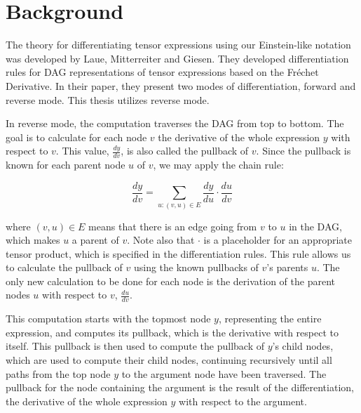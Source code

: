 \documentclass[12pt, a4paper]{report}
\begin{document}
\section{Background}
The theory for differentiating tensor expressions using our Einstein-like notation was developed by Laue, Mitterreiter and Giesen.
They developed differentiation rules for DAG representations of tensor expressions based on the Fr\'{e}chet Derivative.
In their paper, they present two modes of differentiation, forward and reverse mode.
This thesis utilizes reverse mode. %

In reverse mode, the computation traverses the DAG from top to bottom.
The goal is to calculate for each node $v$ the derivative of the whole expression $y$ with respect to $v$.
This value, $\frac{dy}{dv}$, is also called the pullback of $v$.
Since the pullback is known for each parent node $u$ of $v$, we may apply the chain rule:

\begin{equation}
    \frac{dy}{dv} = \sum_{u: (v,u) \in E} \frac{dy}{du} \cdot \frac{du}{dv}
    \label{eq:diff}
\end{equation}

where $(v,u) \in E$ means that there is an edge going from $v$ to $u$ in the DAG, which makes $u$ a parent of $v$. 
Note also that $\cdot$ is a placeholder for an appropriate tensor product, which is specified in the differentiation rules. 
This rule allows us to calculate the pullback of $v$ using the known pullbacks of $v$'s parents $u$.
The only new calculation to be done for each node is the derivation of the parent nodes $u$ with respect to $v$, $\frac{du}{dv}$.

This computation starts with the topmost node $y$, representing the entire expression, and computes its pullback, which is the derivative with respect to itself.
This pullback is then used to compute the pullback of $y$'s child nodes, which are used to compute their child nodes, continuing recursively until all paths from the top node $y$ to the argument node have been traversed.
The pullback for the node containing the argument is the result of the differentiation, the derivative of the whole expression $y$ with respect to the argument.
\end{document}
